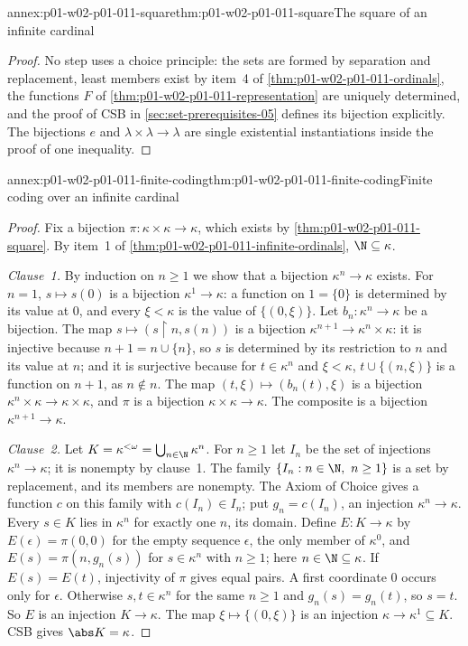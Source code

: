 \begin{annexitem}{annex:p01-w02-p01-011-square}{thm:p01-w02-p01-011-square}{The square of an infinite cardinal}
\begin{proof}
No step uses a choice principle: the sets are formed by separation and
replacement, least members exist by item~4 of
\cref{thm:p01-w02-p01-011-ordinals}, the functions \(F\) of
\cref{thm:p01-w02-p01-011-representation} are uniquely determined, and the
proof of CSB in \cref{sec:set-prerequisites-05} defines its bijection
explicitly. The bijections \(e\) and \(\lambda\times\lambda\to\lambda\) are
single existential instantiations inside the proof of one inequality.
\end{proof}
\end{annexitem}

\begin{annexitem}{annex:p01-w02-p01-011-finite-coding}{thm:p01-w02-p01-011-finite-coding}{Finite coding over an infinite cardinal}
\begin{proof}
Fix a bijection \(\pi:\kappa\times\kappa\to\kappa\), which exists by
\cref{thm:p01-w02-p01-011-square}. By item~1 of
\cref{thm:p01-w02-p01-011-infinite-ordinals}, \(\N\subseteq\kappa\).

\emph{Clause~1.} By induction on \(n\geq1\) we show that a bijection
\(\kappa^n\to\kappa\) exists. For \(n=1\), \(s\mapsto s(0)\) is a bijection
\(\kappa^1\to\kappa\): a function on \(1=\{0\}\) is determined by its value
at \(0\), and every \(\xi<\kappa\) is the value of \(\{(0,\xi)\}\). Let
\(b_n:\kappa^n\to\kappa\) be a bijection. The map
\(s\mapsto(s\mathbin{\upharpoonright}n,s(n))\) is a bijection
\(\kappa^{n+1}\to\kappa^n\times\kappa\): it is injective because
\(n+1=n\cup\{n\}\), so \(s\) is determined by its restriction to \(n\) and
its value at \(n\); and it is surjective because for \(t\in\kappa^n\) and
\(\xi<\kappa\), \(t\cup\{(n,\xi)\}\) is a function on \(n+1\), as
\(n\notin n\). The map \((t,\xi)\mapsto(b_n(t),\xi)\) is a bijection
\(\kappa^n\times\kappa\to\kappa\times\kappa\), and \(\pi\) is a bijection
\(\kappa\times\kappa\to\kappa\). The composite is a bijection
\(\kappa^{n+1}\to\kappa\).

\emph{Clause~2.} Let \(K=\kappa^{<\omega}=\bigcup_{n\in\N}\kappa^n\). For
\(n\geq1\) let \(I_n\) be the set of injections \(\kappa^n\to\kappa\); it is
nonempty by clause~1. The family \(\{I_n:n\in\N,\ n\geq1\}\) is a set by
replacement, and its members are nonempty. The Axiom of Choice gives a
function \(c\) on this family with \(c(I_n)\in I_n\); put
\(g_n=c(I_n)\), an injection \(\kappa^n\to\kappa\). Every \(s\in K\) lies in
\(\kappa^n\) for exactly one \(n\), its domain. Define \(E:K\to\kappa\) by
\(E(\epsilon)=\pi(0,0)\) for the empty sequence \(\epsilon\), the only member
of \(\kappa^0\), and \(E(s)=\pi(n,g_n(s))\) for \(s\in\kappa^n\) with
\(n\geq1\); here \(n\in\N\subseteq\kappa\). If \(E(s)=E(t)\), injectivity of
\(\pi\) gives equal pairs. A first coordinate \(0\) occurs only for
\(\epsilon\). Otherwise \(s,t\in\kappa^n\) for the same \(n\geq1\) and
\(g_n(s)=g_n(t)\), so \(s=t\). So \(E\) is an injection \(K\to\kappa\). The
map \(\xi\mapsto\{(0,\xi)\}\) is an injection \(\kappa\to\kappa^1\subseteq K\).
CSB gives \(\abs K=\kappa\).


\end{proof}
\end{annexitem}
